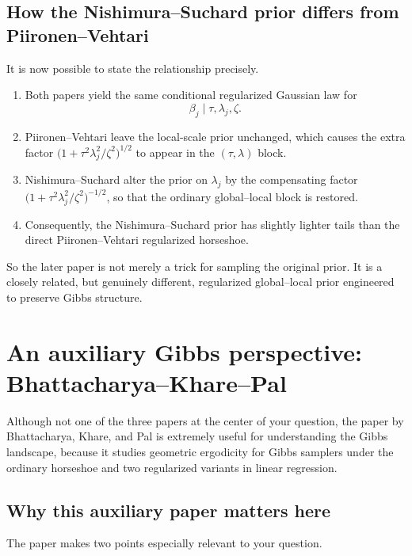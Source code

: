 \documentclass[11pt]{article}
\begin{document}
\subsection{How the Nishimura--Suchard prior differs from Piironen--Vehtari}

It is now possible to state the relationship precisely.

\begin{enumerate}
\item Both papers yield the same conditional regularized Gaussian law for
\[
\beta_j \mid \tau,\lambda_j,\zeta.
\]
\item Piironen--Vehtari leave the local-scale prior unchanged, which causes the extra factor $\bigl(1+\tau^2\lambda_j^2/\zeta^2\bigr)^{1/2}$ to appear in the $(\tau,\lambda)$ block.
\item Nishimura--Suchard alter the prior on $\lambda_j$ by the compensating factor $\bigl(1+\tau^2\lambda_j^2/\zeta^2\bigr)^{-1/2}$, so that the ordinary global--local block is restored.
\item Consequently, the Nishimura--Suchard prior has slightly lighter tails than the direct Piironen--Vehtari regularized horseshoe.
\end{enumerate}

So the later paper is not merely a trick for sampling the original prior. It is a closely related, but genuinely different, regularized global--local prior engineered to preserve Gibbs structure.

\section{An auxiliary Gibbs perspective: Bhattacharya--Khare--Pal}

Although not one of the three papers at the center of your question, the paper by Bhattacharya, Khare, and Pal is extremely useful for understanding the Gibbs landscape, because it studies geometric ergodicity for Gibbs samplers under the ordinary horseshoe and two regularized variants in linear regression.

\subsection{Why this auxiliary paper matters here}

The paper makes two points especially relevant to your question.
\end{document}
